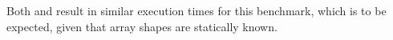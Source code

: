 Both \wlf and \awlf result in similar execution times for this
benchmark, which is to be expected, given that array shapes
are statically known.

